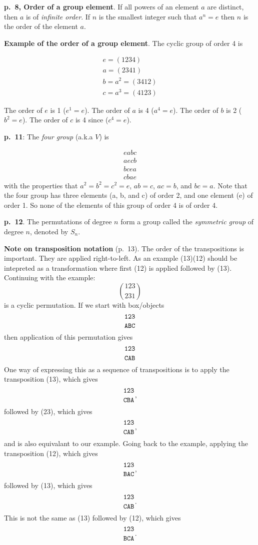 \documentclass{book}
\begin{document}
{\bf p.\ 8, Order of a group element}. If all powers of an element $a$
are distinct, then $a$ is of {\it infinite order}. If $n$ is the
smallest integer such that $a^n = e$ then $n$ is the order of the
element $a$.

{\bf Example of the order of a group element}. The cyclic group of order 4 is

\begin{equation*}
\begin{split}
e = (1234) \\
a = (2341) \\
b = a^2 = (3412) \\
c = a^3 = (4123)
\end{split}
\end{equation*}

The order of $e$ is 1 ($e^1 = e$). The order of $a$ is 4 ($a^4 = e$). The order of $b$ is 2 ($b^2 = e$). The order of $c$ is 4 since ($c^4 = e$).

{\bf p.\ 11}: The {\it four group} (a.k.a $V$) is

\begin{equation}
\begin{split}
  eabc \\
  aecb \\
  bcea \\
  cbae
\end{split}
\end{equation}
with the properties that $a^2 = b^2 = c^2 = e$, $ab = c$, $ac = b$,
and $bc = a$. Note that the four group has three elements (a, b, and
c) of order 2, and one element (e) of order 1. So none of the elements
of this group of order 4 is of order 4.

{\bf p.\ 12}. The permutations of degree $n$ form a group called the
{\it symmetric group} of degree $n$, denoted by $S_n$.

{\bf Note on transposition notation} (p.\ 13). The order of the
transpositions is important. They are applied right-to-left. As an example
(13)(12) should be intepreted as a transformation where
first (12) is applied followed by (13). Continuing with the example:
$$
\genfrac(){0pt}0{123}{231}
$$
is a cyclic permutation. If we start with box/objects
$$
\genfrac{}{}{0pt}0{\tt 123}{\tt ABC}
$$
then application of this permutation gives
$$
\genfrac{}{}{0pt}0{\tt 123}{\tt CAB}
$$
One way of expressing this as a sequence of transpositions is to apply the
transposition (13), which gives
$$
\genfrac{}{}{0pt}0{\tt 123}{\tt CBA},
$$
followed by (23), which gives
$$
\genfrac{}{}{0pt}0{\tt 123}{\tt CAB},
$$
and is also equivalant to our example. Going back to the example, applying the
transposition (12), which gives
$$
\genfrac{}{}{0pt}0{\tt 123}{\tt BAC},
$$
followed by (13), which gives
$$
\genfrac{}{}{0pt}0{\tt 123}{\tt CAB}.
$$
This is not the same as (13) followed by (12), which gives
$$
\genfrac{}{}{0pt}0{\tt 123}{\tt BCA}.
$$
\end{document}
